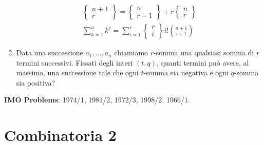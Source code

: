 \documentclass[a4paper,10pt]{article}
\newcommand{\Stirling}[2]
{
	\left\{\!
	\begin{array}{c}
		#1\\
		#2
	\end{array}
	\!\right\}
}
\begin{document}
\begin{enumerate}
\begin{eqnarray*}
		\Stirling{n+1}{r} = \Stirling{n}{r-1} +	r \Stirling n r \\
		
		\sum_{k=1}^{n} k^r = \sum_{i=1}^{r} \Stirling{r}{i} i! \binom{n+1}{i+1}
	\end{eqnarray*}
	
	\item Data una successione $a_1, \dots, a_n$ chiamiamo $r$-somma una
	qualsiasi somma di $r$ termini successivi. Fissati degli interi $(t,q)$,
	quanti termini pu\`o avere, al massimo, una successione tale che ogni
	$t$-somma sia negativa e ogni $q$-somma sia positiva?


\end{enumerate}
\bigskip\bigskip

\textbf{IMO Problems}: 1974/1, 1981/2, 1972/3, 1998/2, 1966/1.


\section{Combinatoria 2}
\end{document}
